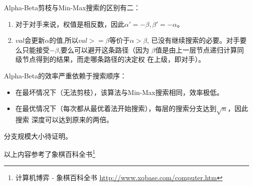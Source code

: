 Alpha-Beta剪枝与Min-Max搜索的区别有二：

\begin{enumerate}
    \item 对于对手来说，权值是相反数，因此$\alpha'=-\beta,\beta'=-\alpha$。
    \item $val$会更新$\alpha$的值,所以$val>=\beta$等价于$\alpha>\beta$,
    已没有继续搜索的必要。对手要么只能接受$-\beta$,要么可以避开这条路径（因为
    $\beta$值是由上一层节点递归计算同级节点得到的结果，而走哪条路径的决定权
    在上级，即对手）。
\end{enumerate}

Alpha-Beta的效率严重依赖于搜索顺序：

\begin{itemize}
	\item 在最坏情况下（无法剪枝），该算法与Min-Max搜索相同，效率极低。
	\item 在最优情况下（每次都从最优着法开始搜索），每层的搜索分支达到$\sqrt{n}$，因此搜索
	      深度可以达到原来的两倍。
\end{itemize}

分支规模大小待证明。

以上内容参考了象棋百科全书\footnote{计算机博弈 - 象棋百科全书
	\url{http://www.xqbase.com/computer.htm}}
